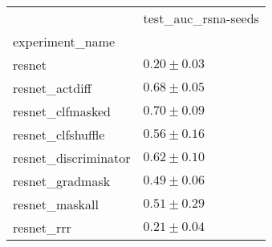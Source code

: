 \begin{tabular}{ll}
\toprule
{} & test_auc_rsna-seeds \\
experiment_name      &                     \\
\midrule
resnet               &       $0.20\pm0.03$ \\
resnet_actdiff       &       $0.68\pm0.05$ \\
resnet_clfmasked     &       $0.70\pm0.09$ \\
resnet_clfshuffle    &       $0.56\pm0.16$ \\
resnet_discriminator &       $0.62\pm0.10$ \\
resnet_gradmask      &       $0.49\pm0.06$ \\
resnet_maskall       &       $0.51\pm0.29$ \\
resnet_rrr           &       $0.21\pm0.04$ \\
\bottomrule
\end{tabular}
